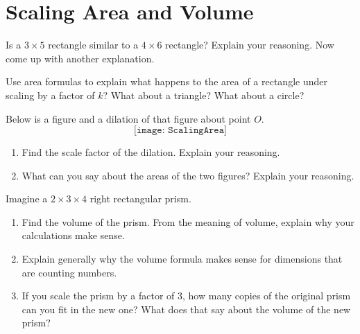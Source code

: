 \newpage
\section{Scaling Area and Volume}

\begin{prob}
Is a $3\times 5$ rectangle similar to a $4\times 6$ rectangle?  Explain your reasoning.  Now come up with another explanation. 
\end{prob}

\begin{prob}
Use area formulas to explain what happens to the area of a rectangle under scaling by a factor of $k$?  What about a triangle?  What about a circle?  
\end{prob}

\begin{prob}
Below is a figure and a dilation of that figure about point $O$.  
$$\texttt{[image: ScalingArea]}$$
\begin{enumerate}
\item Find the scale factor of the dilation.  Explain your reasoning. 
\item What can you say about the areas of the two figures?  Explain your reasoning. 
\end{enumerate}
\end{prob}

\begin{prob}
Imagine a $2\times 3\times 4$ right rectangular prism.  
\begin{enumerate}
\item Find the volume of the prism.  From the meaning of volume, explain why your calculations make sense.  
\item Explain generally why the volume formula makes sense for dimensions that are counting numbers.  
\item If you scale the prism by a factor of 3, how many copies of the original prism can you fit in the new one?  What does that say about the volume of the new prism?   
\end{enumerate}
\end{prob}

